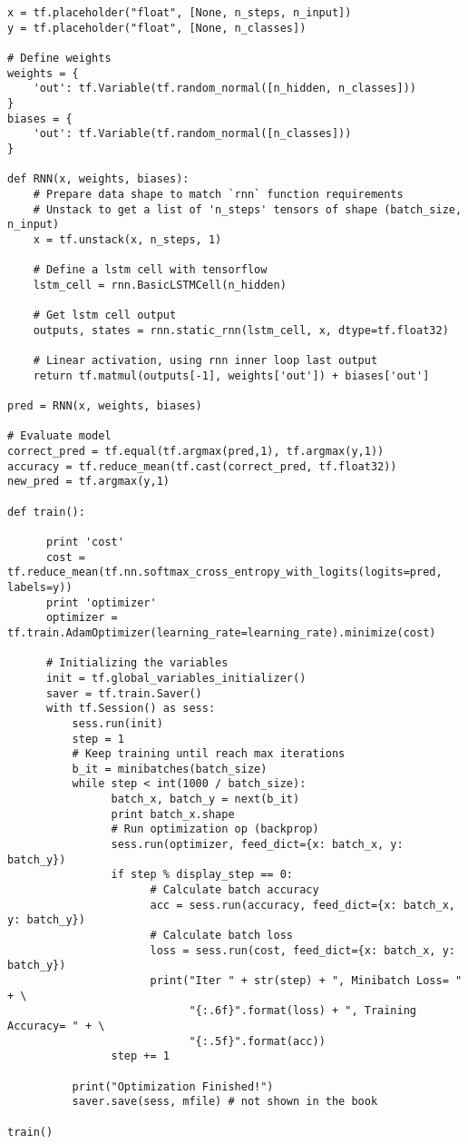 \documentclass[12pt,fleqn]{article}\usepackage{../../common}
\begin{document}
\begin{verbatim}
x = tf.placeholder("float", [None, n_steps, n_input])
y = tf.placeholder("float", [None, n_classes])

# Define weights
weights = {
    'out': tf.Variable(tf.random_normal([n_hidden, n_classes]))
}
biases = {
    'out': tf.Variable(tf.random_normal([n_classes]))
}

def RNN(x, weights, biases):
    # Prepare data shape to match `rnn` function requirements
    # Unstack to get a list of 'n_steps' tensors of shape (batch_size, n_input)
    x = tf.unstack(x, n_steps, 1)

    # Define a lstm cell with tensorflow
    lstm_cell = rnn.BasicLSTMCell(n_hidden)

    # Get lstm cell output
    outputs, states = rnn.static_rnn(lstm_cell, x, dtype=tf.float32)

    # Linear activation, using rnn inner loop last output
    return tf.matmul(outputs[-1], weights['out']) + biases['out']

pred = RNN(x, weights, biases)

# Evaluate model
correct_pred = tf.equal(tf.argmax(pred,1), tf.argmax(y,1))
accuracy = tf.reduce_mean(tf.cast(correct_pred, tf.float32))
new_pred = tf.argmax(y,1)

def train():

      print 'cost'
      cost = tf.reduce_mean(tf.nn.softmax_cross_entropy_with_logits(logits=pred, labels=y))
      print 'optimizer'
      optimizer = tf.train.AdamOptimizer(learning_rate=learning_rate).minimize(cost)
      
      # Initializing the variables
      init = tf.global_variables_initializer()
      saver = tf.train.Saver()
      with tf.Session() as sess:
          sess.run(init)
          step = 1
          # Keep training until reach max iterations
          b_it = minibatches(batch_size)
          while step < int(1000 / batch_size):
                batch_x, batch_y = next(b_it)
                print batch_x.shape
                # Run optimization op (backprop)
                sess.run(optimizer, feed_dict={x: batch_x, y: batch_y})
                if step % display_step == 0:
                      # Calculate batch accuracy
                      acc = sess.run(accuracy, feed_dict={x: batch_x, y: batch_y})
                      # Calculate batch loss
                      loss = sess.run(cost, feed_dict={x: batch_x, y: batch_y})
                      print("Iter " + str(step) + ", Minibatch Loss= " + \
                            "{:.6f}".format(loss) + ", Training Accuracy= " + \
                            "{:.5f}".format(acc))
                step += 1

          print("Optimization Finished!")
          saver.save(sess, mfile) # not shown in the book

train()
\end{verbatim}
\end{document}
